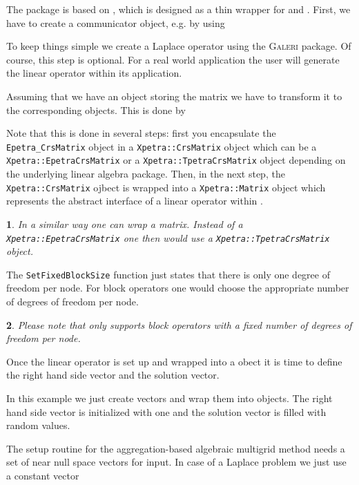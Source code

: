 \documentclass{article}
\newtheorem*{mycomment}{\ding{42}}
\begin{document}
The \muelu package is based on \xpetra, which is designed as a thin wrapper for \epetra and \tpetra. First, we have to create a communicator object, e.g. by using 



To keep things simple we create a Laplace operator using the \textsc{Galeri} package. Of course, this step is optional. For a real world application the user will generate the linear operator within its application.


Assuming that we have an \epetra object storing the matrix we have to transform it to the corresponding \xpetra objects. This is done by

Note that this is done in several steps: first you encapsulate the \texttt{Epetra\_CrsMatrix} object in a \texttt{Xpetra::CrsMatrix} object which can be a \texttt{Xpetra::EpetraCrsMatrix} or a \texttt{Xpetra::TpetraCrsMatrix} object 
depending on the underlying linear algebra package. Then, in the next step, the \texttt{Xpetra::CrsMatrix} ojbect is wrapped into a \texttt{Xpetra::Matrix} object which represents the abstract interface of a linear operator within \muelu.
\begin{mycomment}
In a similar way one can wrap a \tpetra matrix. Instead of a \texttt{Xpetra::EpetraCrsMatrix} one then would use a \texttt{Xpetra::TpetraCrsMatrix} object.
\end{mycomment}
The \texttt{SetFixedBlockSize} function just states that there is only one degree of freedom per node. For block operators one would choose the appropriate number of degrees of freedom per node.
\begin{mycomment}
Please note that \muelu only supports block operators with a fixed number of degrees of freedom per node.
\end{mycomment}

Once the linear operator is set up and wrapped into a \xpetra obect it is time to define the right hand side vector and the solution vector.

In this example we just create \epetra vectors and wrap them into \xpetra objects. The right hand side vector is initialized with one and the solution vector is filled with random values.

The setup routine for the aggregation-based algebraic multigrid method needs a set of near null space vectors for input. In case of a Laplace problem we just use a constant vector

\end{document}
